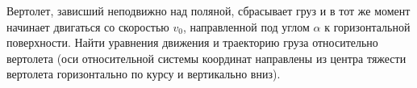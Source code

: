 Вертолет, зависший неподвижно над поляной, 
сбрасывает груз и в тот же момент 
начинает двигаться со скоростью
$v_{0}$, направленной под углом 
$\alpha$ к горизонтальной поверхности.
Найти уравнения движения и 
траекторию груза относительно вертолета 
(оси относительной системы 
координат направлены из центра 
тяжести вертолета
горизонтально по курсу и вертикально вниз).
